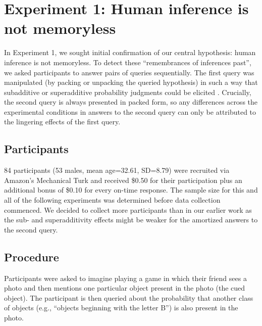 \section{Experiment 1: Human inference is not memoryless}

In Experiment 1, we sought initial confirmation of our central hypothesis: human inference is not memoryless. To detect these ``remembrances of inferences past'', we asked participants to answer pairs of queries sequentially. The first query was manipulated (by packing or unpacking the queried hypothesis) in such a way that subadditive or superadditive probability judgments could be elicited \citep{dasgupta2017hypotheses}. Crucially, the second query is always presented in packed form, so any differences across the experimental conditions in answers to the second query can only be attributed to the lingering effects of the first query.

\subsection{Participants}

84 participants (53 males, mean age=32.61, SD=8.79) were recruited via Amazon's Mechanical Turk and received \$0.50 for their participation plus an additional bonus of \$0.10 for every on-time response. 
The sample size for this and all of the following experiments was determined before data collection commenced. We decided to collect more participants than in our earlier work \citep{dasgupta2017hypotheses} as the sub- and superadditivity effects might be weaker for the amortized answers to the second query.

\subsection{Procedure}

Participants were asked to imagine playing a game in which their friend sees a photo and then mentions one particular object present in the photo (the cued object). The participant is then queried about the probability that another class of objects (e.g., ``objects beginning with the letter B'') is also present in the photo.

